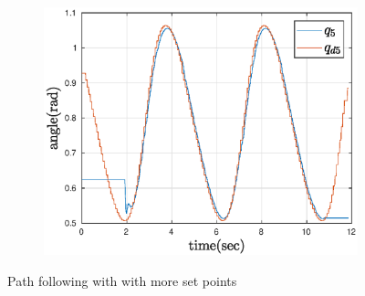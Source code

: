 \begin{figure}[htbp]
\begin{subfigure}[htbp]{0.45\textwidth}
        \includegraphics[width = \picsSiz\linewidth]{img/pathF5ff.eps}
        \caption{ }
    \end{subfigure}
    \caption{Path following with with more set points}
    \label{fig:pathTSff}
\end{figure}


